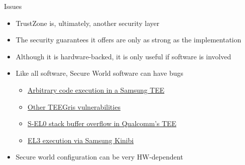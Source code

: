 \begin{frame}{Issues}
  \begin{itemize}
    \item TrustZone is, ultimately, another security layer
    \item The security guarantees it offers are only as strong as the implementation
    \item Although it is hardware-backed, it is only useful if software is involved
    \item Like all software, Secure World software can have bugs
    \begin{itemize}
      \item \href{https://blog.thalium.re/posts/pivoting_to_the_secure_world/}{Arbitrary code execution in a Samsung TEE}
      \item \href{https://www.keysight.com/blogs/en/authors/federico-menarini}{Other TEEGris vulnerabilities}
      \item \href{https://blog.quarkslab.com/attacking-the-arms-trustzone.html}{S-EL0 stack buffer overflow in Qualcomm's TEE}
      \item \href{https://blog.quarkslab.com/a-deep-dive-into-samsungs-trustzone-part-3.html}{EL3 execution via Samsung Kinibi}
    \end{itemize}
    \item Secure world configuration can be very HW-dependent
  \end{itemize}
\end{frame}
